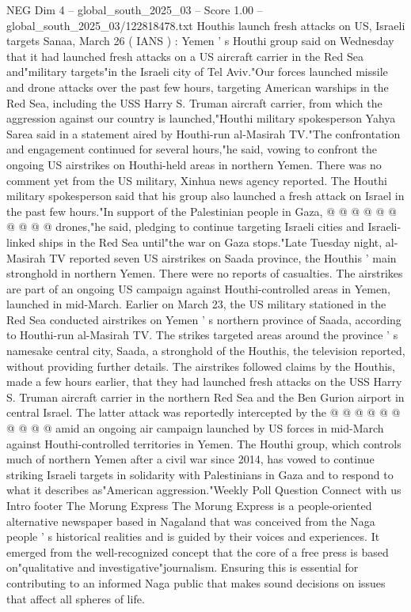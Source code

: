 \begin{textsample}{NEG Dim 4 – global\_south\_2025\_03 – Score 1.00 – global\_south\_2025\_03/122818478.txt}  \label{ex:f4_neg_428}
Houthis launch fresh attacks on US, Israeli targets Sanaa, March 26 ( IANS ) : Yemen ' s Houthi group said on Wednesday that it had launched fresh attacks on a US aircraft carrier in the Red Sea and"military targets"in the Israeli city of Tel Aviv."Our forces launched missile and drone attacks over the past few hours, targeting American warships in the Red Sea, including the USS Harry S.
Truman aircraft carrier, from which the aggression against our country is launched,"Houthi military spokesperson Yahya Sarea said in a statement aired by Houthi-run al-Masirah TV."The confrontation and engagement continued for several hours,"he said, vowing to confront the ongoing US airstrikes on Houthi-held areas in northern Yemen.
There was no comment yet from the US military, Xinhua news agency reported.
The Houthi military spokesperson said that his group also launched a fresh attack on Israel in the past few hours."In support of the Palestinian people in Gaza, @ @ @ @ @ @ @ @ @ @ drones,"he said, pledging to continue targeting Israeli cities and Israeli-linked ships in the Red Sea until"the war on Gaza stops."Late Tuesday night, al-Masirah TV reported seven US airstrikes on Saada province, the Houthis ' main stronghold in northern Yemen.
There were no reports of casualties.
The airstrikes are part of an ongoing US campaign against Houthi-controlled areas in Yemen, launched in mid-March.
Earlier on March 23, the US military stationed in the Red Sea conducted airstrikes on Yemen ' s northern province of Saada, according to Houthi-run al-Masirah TV.
The strikes targeted areas around the province ' s namesake central city, Saada, a stronghold of the Houthis, the television reported, without providing further details.
The airstrikes followed claims by the Houthis, made a few hours earlier, that they had launched fresh attacks on the USS Harry S.
Truman aircraft carrier in the northern Red Sea and the Ben Gurion airport in central Israel.
The latter attack was reportedly intercepted by the @ @ @ @ @ @ @ @ @ @ amid an ongoing air campaign launched by US forces in mid-March against Houthi-controlled territories in Yemen.
The Houthi group, which controls much of northern Yemen after a civil war since 2014, has vowed to continue striking Israeli targets in solidarity with Palestinians in Gaza and to respond to what it describes as"American aggression."Weekly Poll Question Connect with us Intro footer The Morung Express The Morung Express is a people-oriented alternative newspaper based in Nagaland that was conceived from the Naga people ' s historical realities and is guided by their voices and experiences.
It emerged from the well-recognized concept that the core of a free press is based on"qualitative and investigative"journalism.
Ensuring this is essential for contributing to an informed Naga public that makes sound decisions on issues that affect all spheres of life.

\end{textsample}
